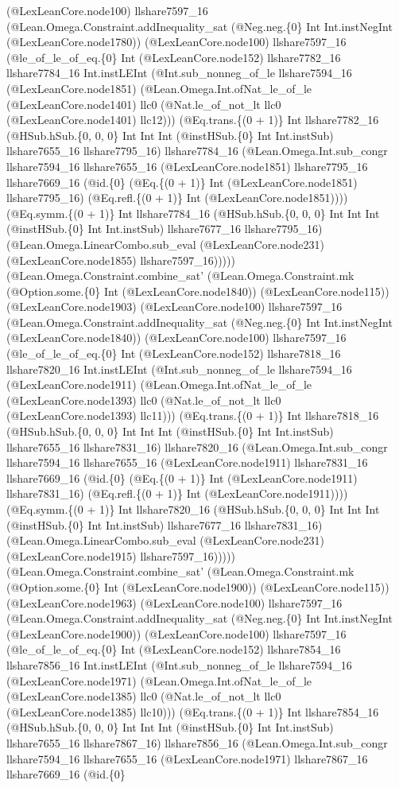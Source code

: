 \documentclass[11pt]{article}
\begin{document}
(@LexLeanCore.node100) llshare7597\_16 (@Lean.Omega.Constraint.addInequality\_sat (@Neg.neg.\{0\} Int Int.instNegInt (@LexLeanCore.node1780)) (@LexLeanCore.node100) llshare7597\_16 (@le\_of\_le\_of\_eq.\{0\} Int (@LexLeanCore.node152) llshare7782\_16 llshare7784\_16 Int.instLEInt (@Int.sub\_nonneg\_of\_le llshare7594\_16 (@LexLeanCore.node1851) (@Lean.Omega.Int.ofNat\_le\_of\_le (@LexLeanCore.node1401) llc0 (@Nat.le\_of\_not\_lt llc0 (@LexLeanCore.node1401) llc12))) (@Eq.trans.\{(0 + 1)\} Int llshare7782\_16 (@HSub.hSub.\{0, 0, 0\} Int Int Int (@instHSub.\{0\} Int Int.instSub) llshare7655\_16 llshare7795\_16) llshare7784\_16 (@Lean.Omega.Int.sub\_congr llshare7594\_16 llshare7655\_16 (@LexLeanCore.node1851) llshare7795\_16 llshare7669\_16 (@id.\{0\} (@Eq.\{(0 + 1)\} Int (@LexLeanCore.node1851) llshare7795\_16) (@Eq.refl.\{(0 + 1)\} Int (@LexLeanCore.node1851)))) (@Eq.symm.\{(0 + 1)\} Int llshare7784\_16 (@HSub.hSub.\{0, 0, 0\} Int Int Int (@instHSub.\{0\} Int Int.instSub) llshare7677\_16 llshare7795\_16) (@Lean.Omega.LinearCombo.sub\_eval (@LexLeanCore.node231) (@LexLeanCore.node1855) llshare7597\_16))))) (@Lean.Omega.Constraint.combine\_sat' (@Lean.Omega.Constraint.mk (@Option.some.\{0\} Int (@LexLeanCore.node1840)) (@LexLeanCore.node115)) (@LexLeanCore.node1903) (@LexLeanCore.node100) llshare7597\_16 (@Lean.Omega.Constraint.addInequality\_sat (@Neg.neg.\{0\} Int Int.instNegInt (@LexLeanCore.node1840)) (@LexLeanCore.node100) llshare7597\_16 (@le\_of\_le\_of\_eq.\{0\} Int (@LexLeanCore.node152) llshare7818\_16 llshare7820\_16 Int.instLEInt (@Int.sub\_nonneg\_of\_le llshare7594\_16 (@LexLeanCore.node1911) (@Lean.Omega.Int.ofNat\_le\_of\_le (@LexLeanCore.node1393) llc0 (@Nat.le\_of\_not\_lt llc0 (@LexLeanCore.node1393) llc11))) (@Eq.trans.\{(0 + 1)\} Int llshare7818\_16 (@HSub.hSub.\{0, 0, 0\} Int Int Int (@instHSub.\{0\} Int Int.instSub) llshare7655\_16 llshare7831\_16) llshare7820\_16 (@Lean.Omega.Int.sub\_congr llshare7594\_16 llshare7655\_16 (@LexLeanCore.node1911) llshare7831\_16 llshare7669\_16 (@id.\{0\} (@Eq.\{(0 + 1)\} Int (@LexLeanCore.node1911) llshare7831\_16) (@Eq.refl.\{(0 + 1)\} Int (@LexLeanCore.node1911)))) (@Eq.symm.\{(0 + 1)\} Int llshare7820\_16 (@HSub.hSub.\{0, 0, 0\} Int Int Int (@instHSub.\{0\} Int Int.instSub) llshare7677\_16 llshare7831\_16) (@Lean.Omega.LinearCombo.sub\_eval (@LexLeanCore.node231) (@LexLeanCore.node1915) llshare7597\_16))))) (@Lean.Omega.Constraint.combine\_sat' (@Lean.Omega.Constraint.mk (@Option.some.\{0\} Int (@LexLeanCore.node1900)) (@LexLeanCore.node115)) (@LexLeanCore.node1963) (@LexLeanCore.node100) llshare7597\_16 (@Lean.Omega.Constraint.addInequality\_sat (@Neg.neg.\{0\} Int Int.instNegInt (@LexLeanCore.node1900)) (@LexLeanCore.node100) llshare7597\_16 (@le\_of\_le\_of\_eq.\{0\} Int (@LexLeanCore.node152) llshare7854\_16 llshare7856\_16 Int.instLEInt (@Int.sub\_nonneg\_of\_le llshare7594\_16 (@LexLeanCore.node1971) (@Lean.Omega.Int.ofNat\_le\_of\_le (@LexLeanCore.node1385) llc0 (@Nat.le\_of\_not\_lt llc0 (@LexLeanCore.node1385) llc10))) (@Eq.trans.\{(0 + 1)\} Int llshare7854\_16 (@HSub.hSub.\{0, 0, 0\} Int Int Int (@instHSub.\{0\} Int Int.instSub) llshare7655\_16 llshare7867\_16) llshare7856\_16 (@Lean.Omega.Int.sub\_congr llshare7594\_16 llshare7655\_16 (@LexLeanCore.node1971) llshare7867\_16 llshare7669\_16 (@id.\{0\} 
\end{document}
